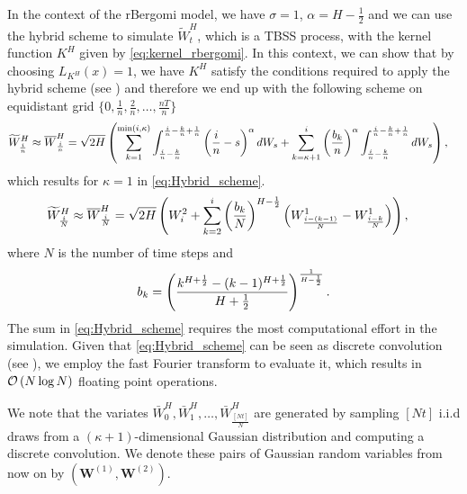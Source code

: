 In the context of the rBergomi model, we have $\sigma=1$, $\alpha=H-\frac{1}{2}$ and we can  use the hybrid scheme to simulate $\widetilde{W}^H_t$, which is  a TBSS process, with the kernel function $K^H$ given by \eqref{eq:kernel_rbergomi}. In this context, we can show that by choosing $L_{K^H}(x)=1$, we have  $K^H$ satisfy the conditions required to apply the hybrid scheme  (see \cite{bennedsen2017hybrid}) and therefore we end up with
the following scheme on equidistant grid $\{0,\frac{1}{n},\frac{2}{n},\dots,\frac{nT}{n}\}$
\begin{align}\label{eq:Hybrid_scheme_pre}
\widetilde{W}^H_{\frac{i}{n}} \approx \overline{W}^H_{\frac{i}{n}}&= \sqrt{2H} \left(  \sum_{k=1}^{\min(i,\kappa)} \int_{\frac{i}{n}-\frac{k}{n}}^{\frac{i}{n}-\frac{k}{n}+\frac{1}{n}} \left(\frac{i}{n}-s\right)^\alpha dW_s+\sum_{k=\kappa+1}^{i} \left(\frac{b_k}{n}\right)^{\alpha}  \int_{\frac{i}{n}-\frac{k}{n}}^{\frac{i}{n}-\frac{k}{n}+\frac{1}{n}} dW_s \right) ,
\end{align}
which results for $\kappa=1$  in \eqref{eq:Hybrid_scheme}.
\begin{align}\label{eq:Hybrid_scheme}
\widetilde{W}^H_{\frac{i}{N}} \approx \overline{W}^H_{\frac{i}{N}}&= \sqrt{2H} \left(  W^2_i+\sum_{k=2}^{i} \left(\frac{b_k}{N}\right)^{H-\frac{1}{2}} \left(W_{\frac{i-(k-1)}{N}}^1-W_{\frac{i-k}{N}}^1\right)\right),
\end{align}
where $N$ is the number of time steps and 
$$ b_k=\left(\frac{k^{H+\frac{1}{2}}-(k-1)^{H+\frac{1}{2} }}{H+\frac{1}{2}}\right)^{\frac{1}{H-\frac{1}{2}}} .$$
The sum in \eqref{eq:Hybrid_scheme} requires the most computational effort in the simulation. Given that \eqref{eq:Hybrid_scheme} can be seen as discrete convolution  (see \cite{bennedsen2017hybrid}), we employ the fast Fourier transform to evaluate it, which results in  ${\mathcal{O}}\left(N \log N\right)$ floating point operations.

We note that the variates $\bar{W}_0^{H},\bar{W}_1^{H},\dots,\bar{W}_{\frac{[Nt]}{N}}^{H}$ are  generated by sampling $[Nt]$ i.i.d draws from a $(\kappa+1)$-dimensional Gaussian distribution and computing a discrete convolution. We denote these pairs  of Gaussian random variables from now on by $(\mathbf{W}^{(1)},\mathbf{W}^{(2)})$.
